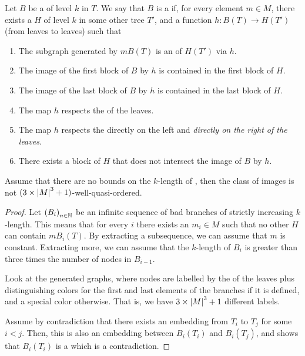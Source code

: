 \begin{definition}
    \label{good-bough:def}
    Let $B$ be a  of level $k$ in $T$.
    We say that $B$ is a  if, for every element $m \in M$,
    there exists a  $H$ of level $k$ in some other tree $T'$,
    and a function $h \colon B(T) \to H(T')$ (from leaves to leaves) such that
    \begin{enumerate}
        \item The subgraph generated by $m B(T)$ 
            is an  of $H(T')$
            via $h$.
        \item The image of the first block of $B$ by $h$
            is contained in the first block of $H$.
        \item The image of the last block of $B$ by $h$
            is contained in the last block of $H$.
        \item The map $h$ respects the  of the leaves.
        \item The map $h$ respects the  directly on the left
            and \emph{directly on the right of the leaves}.
        \item There exists a block of $H$ that does not intersect
            the image of $B$ by $h$.
    \end{enumerate}
\end{definition}

\begin{lemma}
    \label{bad-bough-wqo:lem}
    Assume that there are no bounds on the $k$-length of , then 
    the class of images is not $(3 \times \left| M \right|^3 + 1)$-well-quasi-ordered.
\end{lemma}
\begin{proof}
    Let $\seqof{B_i}$ be an infinite sequence of bad branches of strictly increasing $k$-length.
    This means that for every $i$ there exists an $m_i \in M$ such that
    no other  $H$ can contain $m B_i(T)$. 
    By extracting a subsequence, we can assume that $m$ is constant.
    Extracting more, we can assume that the $k$-length of $B_i$ is greater than three times the
    number of nodes in $B_{i-1}$.

    Look at the generated graphs, where nodes are labelled by the  of the leaves plus distinguishing colors for the first and last
    elements of the branches if it is defined, and a special color otherwise.
    That is, we have $3 \times \left| M \right|^3 + 1$ different labels.

    Assume by contradiction that there exists an embedding from $T_i$ to $T_j$
    for some $i < j$. Then, this is also an embedding between $B_i(T_i)$ and
    $B_i(T_j)$, and shows that $B_i(T_i)$ is a  which is a
    contradiction.
\end{proof}

